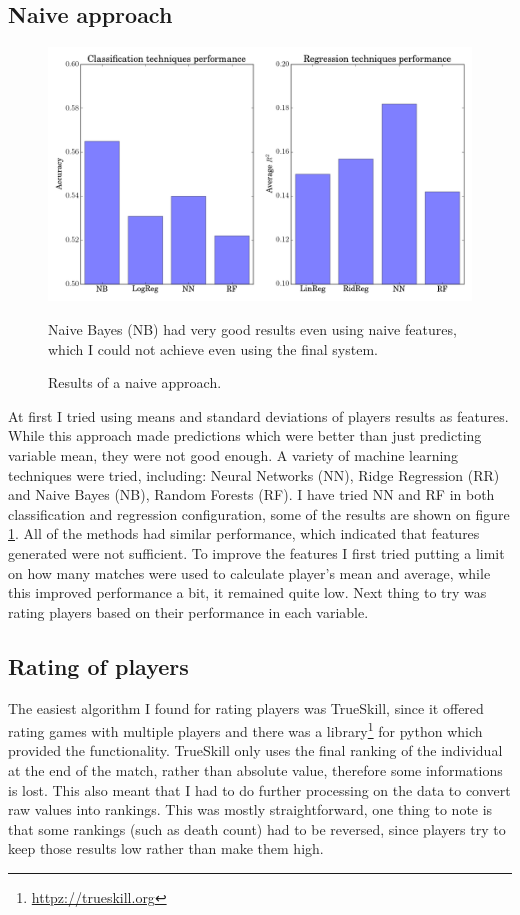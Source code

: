 \documentclass[12pt,a4paper]{book}
\newcommand\note[1]{\vspace*{-0.5\baselineskip}\caption*{#1}}
\begin{document}
\subsection{Naive approach}
\begin{figure}[ht]
\centering
\includegraphics[scale=0.5]{simple-results}
\caption{Results of a naive approach.}
\note{Naive Bayes (NB) had very good results even using naive features, which I could not achieve even using the final system.}
\label{fig:simple-results}
\end{figure}

At first I tried using means and standard deviations of players results as features.
While this approach made predictions which were better than just predicting variable mean, they were not good enough.
A variety of machine learning techniques were tried, including: Neural Networks (NN), Ridge Regression (RR) and Naive Bayes (NB), Random Forests (RF).
I have tried NN and RF in both classification and regression configuration, some of the results are shown on figure \ref{fig:simple-results}.
All of the methods had similar performance, which indicated that features generated were not sufficient.
To improve the features I first tried putting a limit on how many matches were used to calculate player's mean and average, while this improved performance a bit, it remained quite low.
Next thing to try was rating players based on their performance in each variable.

\subsection{Rating of players}
The easiest algorithm I found for rating players was TrueSkill, since it offered rating games with multiple players and there was a library\footnote{\url{httpz://trueskill.org}} for python which provided the functionality.
TrueSkill only uses the final ranking of the individual at the end of the match, rather than absolute value, therefore some informations is lost.
This also meant that I had to do further processing on the data to convert raw values into rankings.
This was mostly straightforward, one thing to note is that some rankings (such as death count) had to be reversed, since players try to keep those results low rather than make them high.
\end{document}
